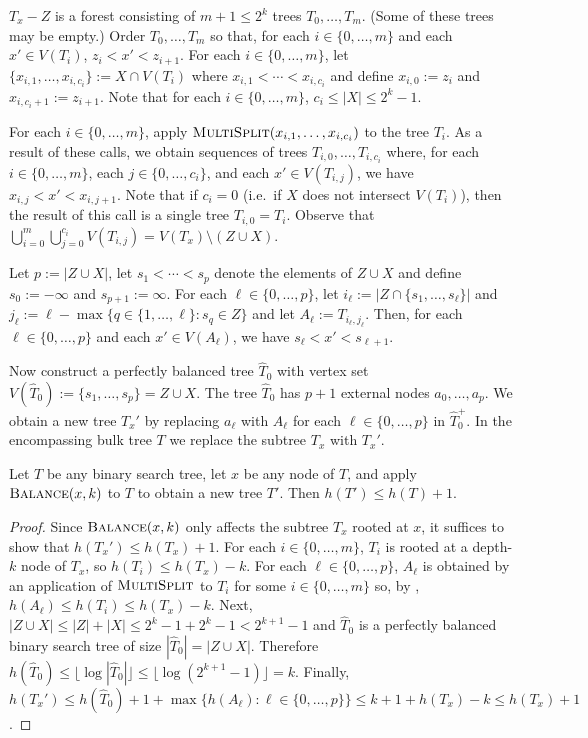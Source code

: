 \documentclass[kpfonts]{patmorin}
\let\le\leqslant
\begin{document}
$T_x-Z$ is a forest consisting of $m+1\le 2^{k}$ trees $T_0,\ldots,T_m$. (Some of these trees may be empty.)  Order $T_{0},\ldots,T_m$ so that, for each $i\in\{0,\ldots,m\}$ and each $x'\in V(T_i)$, $z_i< x' < z_{i+1}$.  For each $i\in\{0,\ldots,m\}$, let $\{x_{i,1},\ldots,x_{i,c_i}\}:=X\cap V(T_i)$ where $x_{i,1}<\cdots<x_{i,c_i}$ and define $x_{i,0}:=z_i$ and $x_{i,c_i+1}:=z_{i+1}$. Note that for each $i\in\{0,\ldots,m\}$, $c_i\le |X|\le 2^k-1$.

For each $i\in\{0,\ldots,m\}$, apply $\textsc{MultiSplit}(x_{i,1},\ldots,x_{i,c_i})$ to the tree $T_i$.  As a result of these calls, we obtain sequences of trees $T_{i,0},\ldots,T_{i,c_i}$ where, for each $i\in\{0,\ldots,m\}$, each $j\in\{0,\ldots,c_i\}$, and each $x'\in V(T_{i,j})$, we have $x_{i,j}<x'<x_{i,j+1}$.  Note that if $c_i=0$ (i.e.\ if $X$ does not intersect $V(T_i)$), then the result of this call is a single tree $T_{i,0}=T_i$.
Observe that $\bigcup_{i=0}^m\bigcup_{j=0}^{c_i} V(T_{i,j}) = V(T_x)\setminus (Z\cup X)$. 

Let $p:=|Z\cup X|$, let $s_1<\cdots< s_p$ denote the elements of $Z\cup X$ and define $s_0:=-\infty$ and $s_{p+1}:=\infty$.  For each $\ell\in\{0,\ldots,p\}$, let $i_\ell:=|Z\cap \{s_1,\ldots,s_\ell\}|$ and $j_\ell:= \ell - \max\{ q\in\{1,\ldots,\ell\}: s_q\in Z\}$ and let $A_\ell:=T_{i_\ell,j_\ell}$.   Then, for each $\ell\in \{0,\ldots,p\}$ and each $x'\in V(A_\ell)$, we have $s_\ell < x' < s_{\ell+1}$.

Now construct a perfectly balanced tree $\hat{T}_0$ with vertex set $V(\hat{T}_0):=\{s_1,\ldots,s_p\}=Z\cup X$.  The tree $\hat{T}_0$ has $p+1$ external nodes $a_0,\ldots,a_p$.  We obtain a new tree $T_x'$ by replacing $a_\ell$ with $A_\ell$ for each $\ell\in\{0,\ldots,p\}$ in $\hat{T}_0^+$.  In the encompassing bulk tree $T$ we replace the subtree $T_x$ with $T_x'$.

\begin{lem}
  Let $T$ be any binary search tree, let $x$ be any node of $T$, and apply $\textsc{Balance}(x,k)$ to $T$ to obtain a new tree $T'$.  Then $h(T')\le h(T)+1$.
\end{lem}

\begin{proof}
  Since $\textsc{Balance}(x,k)$ only affects the subtree $T_x$ rooted at $x$, it suffices to show that $h(T_x')\le h(T_x)+1$.  For each $i\in\{0,\ldots, m\}$, $T_i$ is rooted at a depth-$k$ node of $T_x$, so $h(T_i)\le h(T_x)-k$. For each $\ell \in\{0,\ldots,p\}$, $A_\ell$ is obtained by an application of $\textsc{MultiSplit}$ to $T_i$ for some $i\in\{0,\ldots,m\}$ so, by , $h(A_\ell)\le h(T_i)\le h(T_x)-k$.  Next, $|Z\cup X|\le |Z|+|X| \le 2^k-1 + 2^k-1 < 2^{k+1}-1$ and $\hat{T}_0$ is a perfectly balanced binary search tree of size $|\hat{T}_0|=|Z\cup X|$.  Therefore $h(\hat{T}_0)\le \lfloor\log|\hat{T}_0|\rfloor\le \lfloor\log(2^{k+1}-1)\rfloor = k$.  Finally, $h(T_x')\le h(\hat{T}_0)+1 +\max \{h(A_\ell):\ell\in\{0,\ldots,p\}\} \le k +1 + h(T_x) - k\le h(T_x)+1$.
\end{proof}
\end{document}
